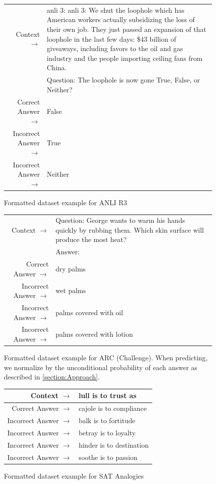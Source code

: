 \documentclass{article}
\begin{document}
\begin{figure} { \tt \footnotesize \begin{tabularx}{\linewidth}{r X} \toprule Context $\to$ & anli 3: anli 3: We shut the loophole which has American workers actually subsidizing the loss of their own job. They just passed an expansion of that loophole in the last few days: \$43 billion of giveaways, including favors to the oil and gas industry and the people importing ceiling fans from China. \\ 
 & Question: The loophole is now gone True, False, or Neither? \\ 
 \midrule Correct Answer $\to$ & False \\ 
 Incorrect Answer $\to$ & True \\ 
 Incorrect Answer $\to$ & Neither\\ \bottomrule \end{tabularx} }  \caption{Formatted dataset example for ANLI R3}  \label{eval:ANLI R3}  \end{figure}
\begin{figure} { \tt \footnotesize \begin{tabularx}{\linewidth}{r X} \toprule Context $\to$ & Question: George wants to warm his hands quickly by rubbing them. Which skin surface will produce the most heat? \\ 
 & Answer: \\ 
 \midrule Correct Answer $\to$ & dry palms \\ 
 Incorrect Answer $\to$ & wet palms \\ 
 Incorrect Answer $\to$ & palms covered with oil \\ 
 Incorrect Answer $\to$ & palms covered with lotion\\ \bottomrule \end{tabularx} }  \caption{Formatted dataset example for ARC (Challenge). When predicting, we normalize by the unconditional probability of each answer as described in \ref{section:Approach}.}  \label{eval:ARC (Challenge)}  \end{figure}
\begin{figure} { \tt \footnotesize \begin{tabularx}{\linewidth}{r X} \toprule Context $\to$ & lull is to trust as \\ 
 \midrule Correct Answer $\to$ & cajole is to compliance \\ 
 Incorrect Answer $\to$ & balk is to fortitude \\ 
 Incorrect Answer $\to$ & betray is to loyalty \\ 
 Incorrect Answer $\to$ & hinder is to destination \\ 
 Incorrect Answer $\to$ & soothe is to passion\\ \bottomrule \end{tabularx} }  \caption{Formatted dataset example for SAT Analogies}  \label{eval:SAT Analogies}  \end{figure}
\end{document}
